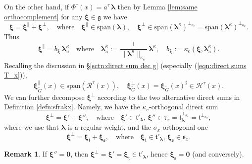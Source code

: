 \documentclass[12pt,a4paper]{article}
\theoremstyle{plain}
\theoremstyle{definition}
\newtheorem{rem}[thm]{Remark}%
\begin{document}
On the other hand, 
if $\Phi^\tau(x)=a^\tau\,\boldsymbol{\lambda}$ then
by Lemma \ref{lem:same orthocomplement} for any 
$\boldsymbol{\xi}\in \mathfrak{g}$ we have
\begin{equation*}
%
\boldsymbol{\xi}=\boldsymbol{\xi}^{\|}+
\boldsymbol{\xi}^\perp,\quad \text{where}\quad
\boldsymbol{\xi}^{\|}\in \mathrm{span}(\boldsymbol{\lambda}),
\quad \boldsymbol{\xi}^{\perp}\in \mathrm{span}(\boldsymbol{\lambda}^\kappa)^{\perp_{\kappa_e}}
=\mathrm{span}
(\boldsymbol{\lambda}^\kappa)^{\perp_{\kappa_x}}.
\end{equation*}
Thus
\begin{equation}
\label{eqn:xi decomposed}
\boldsymbol{\xi}^{\|}=b_{\boldsymbol{\xi}}\,
\boldsymbol{\lambda}^\kappa_u\quad
\text{where}\quad \boldsymbol{\lambda}^\kappa_u:=
\frac{1}{\|\boldsymbol{\lambda}^\kappa\|_{\kappa_e}}
\,\boldsymbol{\lambda}^\kappa,
\quad b_{\boldsymbol{\xi}}:=\kappa_e\left(\boldsymbol{\xi},
\boldsymbol{\lambda}^\kappa_u\right).
\end{equation}
%
Recalling the discussion in \S \ref{sctn:direct sum dec g}
(especially (\ref{eqn:direct sums T_x})),
%
\begin{equation}
\label{eqn:xiparxiperpRH}
\boldsymbol{\xi}^{\|}_{\tilde{G}}(x)\in 
\mathrm{span}\left(\mathcal{R}^\tau(x)\right),
\quad
\boldsymbol{\xi}^{\perp}_{\tilde{G}}(x)=
\boldsymbol{\xi}_{\tilde{G}}(x)^{\sharp}\in 
\mathcal{H}^\tau(x).
\end{equation}
We can further decompose $\boldsymbol{\xi}^\perp$
according to the two alternative direct sums in
Definition \ref{defn:sfrakx}. Namely, we have the $\kappa_e$-orthogonal
direct sum
\begin{equation}
\label{eqn:xi perp decomp 1}
\boldsymbol{\xi}^\perp=\boldsymbol{\xi}'+\boldsymbol{\xi}'',
\quad\text{where}\quad\boldsymbol{\xi}'\in 
\mathfrak{t}'_{\boldsymbol{\lambda}},\,
\boldsymbol{\xi}''\in 
\mathfrak{r}_x=\mathfrak{t}_{\boldsymbol{\lambda}}^{\perp_{\kappa_e}}=\mathfrak{t}^{\perp_{\kappa_e}},
\end{equation}
%
where we use that $\boldsymbol{\lambda}$ is a regular weight,
and the $\sigma_x$-orthogonal one
\begin{equation}
\label{eqn:xitsperp}
\boldsymbol{\xi}^\perp=\boldsymbol{\xi}_{\mathfrak{t}}+\boldsymbol{\xi}_{\mathfrak{s}},
\quad\text{where}\quad\boldsymbol{\xi}_{\mathfrak{t}}\in 
\mathfrak{t}'_{\boldsymbol{\lambda}},\,
\boldsymbol{\xi}_{\mathfrak{s}}\in 
\mathfrak{s}_x.
\end{equation}

\begin{rem}
\label{rem:xii=implisxis=0}
If $\boldsymbol{\xi}''=\mathbf{0}$, then 
$\boldsymbol{\xi}^\perp=\boldsymbol{\xi}'=
\boldsymbol{\xi}_{\mathfrak{t}}\in \mathfrak{t}'_{\boldsymbol{\lambda}}$,
hence $\boldsymbol{\xi}_{\mathfrak{s}}=\mathbf{0}$ (and conversely).
\end{rem}
\end{document}
